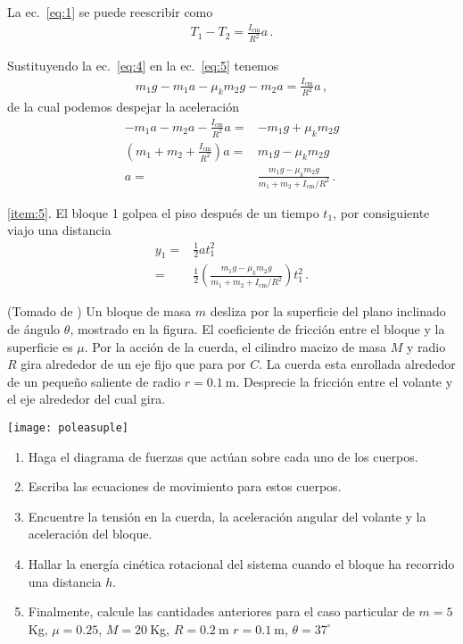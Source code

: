 La ec.~\eqref{eq:1} se puede reescribir como
\begin{align}
  \label{eq:5}
  T_1-T_2=\frac{I_{\text{cm}}}{R^2}a\,.
\end{align}

Sustituyendo la ec.~\eqref{eq:4} en la ec.~\eqref{eq:5} tenemos
\begin{align}
  m_1g -m_1 a-\mu_k m_2 g-m_2 a=\frac{I_{\text{cm}}}{R^2}a\,,
\end{align}
de la cual podemos despejar la aceleración
\begin{align}
    -m_1 a-m_2 a-\frac{I_{\text{cm}}}{R^2}a=&-m_1g+\mu_k m_2 g\nonumber\\
    \left( m_1+m_2+\frac{I_{\text{cm}}}{R^2}\right)a=&m_1g-\mu_k m_2 g\nonumber\\
    a=&\frac{m_1g-\mu_k m_2 g}{m_1+m_2+I_{\text{cm}}/R^2}\,.
\end{align}

\ref{item:5}. El bloque 1 golpea el piso después de un tiempo $t_1$, por consiguiente viajo una distancia
\begin{align}
  y_1=&\frac{1}{2}a t_1^2\nonumber\\
  =&\frac{1}{2}
  \left(
    \frac{m_1g-\mu_k m_2 g}{m_1+m_2+I_{\text{cm}}/R^2}
  \right)t_1^2\,.
\end{align}



\ejemplo{}
(Tomado de \cite{gabriel}) Un bloque de masa $m$ desliza por la superficie del plano inclinado de ángulo $\theta$, mostrado en la figura. El coeficiente de fricción entre el bloque y la superficie es $\mu$. Por la acción de la cuerda, el cilindro macizo de masa $M$ y radio $R$ gira alrededor de un eje fijo que para por $C$.  La cuerda esta enrollada alrededor de un pequeño saliente de radio $r=0.1\ $m. Desprecie la fricción entre el volante y el eje alrededor del cual gira. 

  \begin{minipage}{0.3\linewidth}
    \texttt{[image: poleasuple]}
  \end{minipage}
  \begin{minipage}{0.7\linewidth}
    \begin{enumerate}
    \item Haga el diagrama de fuerzas que actúan sobre cada uno de los cuerpos.
      \label{item:p3a}
    \item Escriba las ecuaciones de movimiento para estos cuerpos.
      \label{item:p3b}
    \item Encuentre la tensión en la cuerda, la aceleración angular del volante y la aceleración del bloque. 
      \label{item:p3c}
    \item Hallar la energía cinética rotacional del sistema cuando el bloque ha recorrido una distancia $h$. 
    \item Finalmente, calcule las cantidades anteriores para el caso particular de $m=5\ $Kg, $\mu=0.25$, $M=20\ $Kg, $R=0.2\ $m $r=0.1\ $m, $\theta=37^\circ$
    \end{enumerate}
  \end{minipage}

